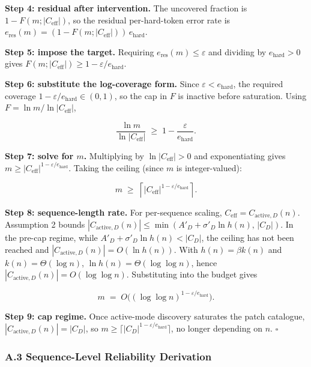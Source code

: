 \documentclass[
]{article}
\begin{document}
\textbf{Step 4: residual after intervention.} The uncovered fraction is
\(1 - F(m; |C_{\text{eff}}|)\), so the residual per-hard-token error
rate is
\(e_{\text{res}}(m) = (1 - F(m; |C_{\text{eff}}|))\, e_{\text{hard}}\).

\textbf{Step 5: impose the target.} Requiring
\(e_{\text{res}}(m) \leq \varepsilon\) and dividing by
\(e_{\text{hard}} > 0\) gives
\(F(m; |C_{\text{eff}}|) \geq 1 - \varepsilon / e_{\text{hard}}\).

\textbf{Step 6: substitute the log-coverage form.} Since
\(\varepsilon < e_{\text{hard}}\), the required coverage
\(1 - \varepsilon/e_{\text{hard}} \in (0, 1)\), so the cap in \(F\) is
inactive before saturation. Using \(F = \ln m / \ln |C_{\text{eff}}|\),

\[
\frac{\ln m}{\ln |C_{\text{eff}}|} \;\geq\; 1 - \frac{\varepsilon}{e_{\text{hard}}}.
\]

\textbf{Step 7: solve for \(m\).} Multiplying by
\(\ln |C_{\text{eff}}| > 0\) and exponentiating gives
\(m \geq |C_{\text{eff}}|^{1 - \varepsilon / e_{\text{hard}}}\). Taking
the ceiling (since \(m\) is integer-valued):

\[
m \;\geq\; \left\lceil |C_{\text{eff}}|^{1 - \varepsilon / e_{\text{hard}}} \right\rceil.
\]

\textbf{Step 8: sequence-length rate.} For per-sequence scaling,
\(C_{\text{eff}} = C_{\text{active},D}(n)\). Assumption 2 bounds
\(|C_{\text{active},D}(n)| \leq \min(A'_D + \sigma'_D \ln h(n),\, |C_D|)\).
In the pre-cap regime, while \(A'_D + \sigma'_D \ln h(n) < |C_D|\), the
ceiling has not been reached and
\(|C_{\text{active},D}(n)| = O(\ln h(n))\). With \(h(n) = \beta k(n)\)
and \(k(n) = \Theta(\log n)\), \(\ln h(n) = \Theta(\log\log n)\), hence
\(|C_{\text{active},D}(n)| = O(\log\log n)\). Substituting into the
budget gives

\[
m \;=\; O\!\bigl((\log\log n)^{1 - \varepsilon / e_{\text{hard}}}\bigr).
\]

\textbf{Step 9: cap regime.} Once active-mode discovery saturates the
patch catalogue, \(|C_{\text{active},D}(n)| = |C_D|\), so
\(m \geq \lceil |C_D|^{1 - \varepsilon / e_{\text{hard}}} \rceil\), no
longer depending on \(n\). \(\square\)

\subsubsection{A.3 Sequence-Level Reliability
Derivation}\label{a.3-sequence-level-reliability-derivation}
\end{document}
